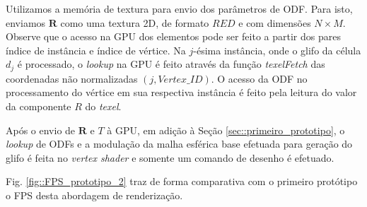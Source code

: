 \documentclass[
    12pt,                %
    oneside,            %
    a4paper,            %
    english,            %
    french,                %
    spanish,            %
    brazil                %
    ]{abntex2}
\begin{document}
Utilizamos a memória de textura para envio dos parâmetros de ODF. Para isto, enviamos $\mathbf{R}$ como uma textura 2D, de formato $RED$ e com dimensões $N\times M$. Observe que o acesso na GPU dos elementos pode ser feito a partir dos pares índice de instância e índice de vértice. Na $j$-ésima instância, onde o glifo da célula $d_j$ é processado, o \textit{lookup} na GPU é feito através da função \textit{texelFetch} das coordenadas não normalizadas $(j, Vertex\_ID)$. O acesso da ODF no processamento do vértice em sua respectiva instância é feito pela leitura do valor da componente $R$ do \textit{texel}.

Após o envio de $\mathbf{R}$ e $T$ à GPU, em adição à Seção \ref{sec::primeiro_prototipo}, o \textit{lookup} de ODFs e a modulação da malha esférica base efetuada para geração do glifo é feita no \textit{vertex shader} e somente um comando de desenho é efetuado.

Fig. \ref{fig::FPS_prototipo_2} traz de forma comparativa com o primeiro protótipo o FPS desta abordagem de renderização.
\end{document}

